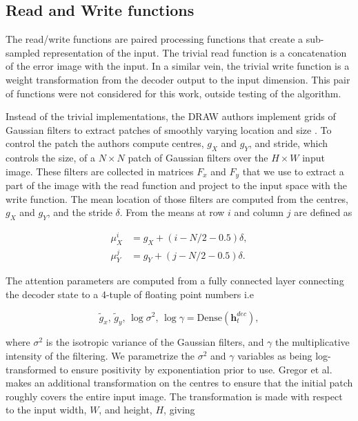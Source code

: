  \subsection{Read and Write functions}

 The read/write functions are paired processing functions that create a sub-sampled representation of the input. The trivial read function is a concatenation of the error image with the input. In a similar vein, the trivial write function is a weight transformation from the decoder output to the input dimension. This pair of functions were not considered for this work, outside testing of the algorithm.  

 Instead of the trivial implementations, the DRAW authors implement grids of Gaussian filters to extract patches of smoothly varying location and size \cite{Gregor2015}. To control the patch the authors compute centres, $g_X$ and $g_Y$, and stride, which controls the size, of a $N \times N$ patch of Gaussian filters over the $H \times W$ input image.  These filters are collected in matrices $F_x$ and $F_y$ that we use to extract a part of the image with the read function and project to the input space with the write function. The mean location of those filters are computed from the centres, $g_X$ and $g_Y$, and the stride $\delta$. From \citet{Gregor2015} the means at row $i$ and column $j$ are defined as 

 \begin{align}
 \mu_X^i &= g_X + (i - N/2-0.5)\delta, \\
 \mu_Y^j &= g_Y + (j - N/2-0.5)\delta.
 \end{align}

\noindent The attention parameters are computed from a fully connected layer connecting the decoder state to a 4-tuple of floating point numbers i.e

\begin{equation}\label{eq:draw_params}
\tilde{g}_x, \,\tilde{g}_y, \, \log \sigma^2, \, \log \gamma = \text{Dense} (\boldsymbol{h}_t^{dec}),
\end{equation}

\noindent where $\sigma^2$ is the isotropic variance of the Gaussian filters, and $\gamma$ the multiplicative intensity of the filtering. We parametrize the $\sigma^2$ and $\gamma$ variables as being log-transformed to ensure positivity by exponentiation prior to use. Gregor et al. makes an additional transformation on the centres to ensure that the initial patch roughly covers the entire input image. The transformation is made with respect to the input width, $W$, and height, $H$, giving

